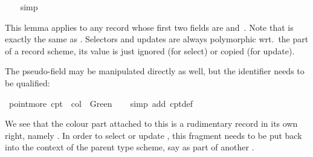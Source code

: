\begin{isabellebody}
%
\isadelimproof
\ \ %
\endisadelimproof
%
\isatagproof
{}\isamarkupfalse%
\ simp%
\endisatagproof
{\isafoldproof}%
%
\isadelimproof
%
\endisadelimproof
%
\begin{isamarkuptext}%
This lemma applies to any record whose first two fields are  and~.  Note that  is exactly the same as .  Selectors and updates are always polymorphic wrt.\ the
   part of a record scheme, its value is just ignored (for
  select) or copied (for update).

  The  pseudo-field may be manipulated directly as well,
  but the identifier needs to be qualified:%
\end{isamarkuptext}%
\isamarkuptrue%
\isamarkupfalse%
\ {}point{}more\ cpt{}\ {}\ {}col\ {}\ Green{}{}\isanewline
%
\isadelimproof
\ \ %
\endisadelimproof
%
\isatagproof
{}\isamarkupfalse%
\ {}simp\ add{}\ cpt{}{}def{}%
\endisatagproof
{\isafoldproof}%
%
\isadelimproof
%
\endisadelimproof
%
\begin{isamarkuptext}%
\noindent
  We see that the colour part attached to this  is a
  rudimentary record in its own right, namely .  In order to select or update , this fragment
  needs to be put back into the context of the parent type scheme, say
  as  part of another .


\end{isamarkuptext}
\end{isabellebody}
